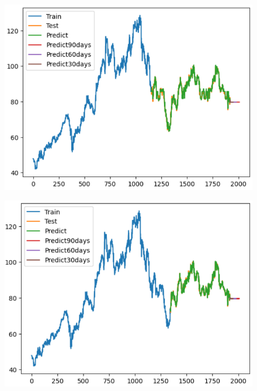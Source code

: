 \documentclass{article}
\begin{document}
\begin{multicols}{2}
\begin{figure}[H]
    \centering
    \begin{minipage}{0.15\textwidth}
    \centering
    \includegraphics[width=1\textwidth]{Image/XGBoost/XGBoost_SONY_6_4.png}
   
    \label{fig:1}
    \end{minipage}%
    \begin{minipage}{0.15\textwidth}
    \centering
    \includegraphics[width=1\textwidth]{Image/XGBoost/XGBoost_SONY_7_3.png}
  

\end{minipage}
\end{figure}
\end{multicols}
\end{document}
